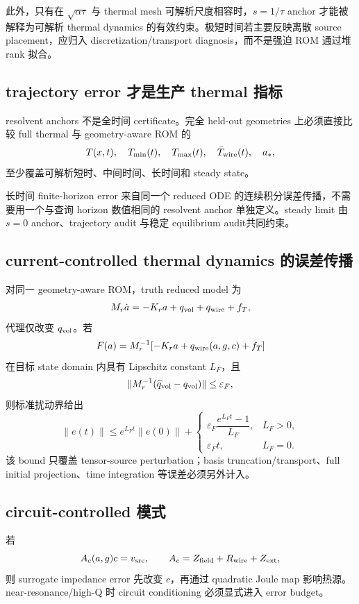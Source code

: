 此外，只有在 $\sqrt{\alpha\tau}$ 与 thermal mesh 可解析尺度相容时，$s=1/\tau$ anchor 才能被解释为可解析 thermal dynamics 的有效约束。极短时间若主要反映离散 source placement，应归入 discretization/transport diagnosis，而不是强迫 ROM 通过堆 rank 拟合。

\subsection{trajectory error 才是生产 thermal 指标}
resolvent anchors 不是全时间 certificate。完全 held-out geometries 上必须直接比较 full thermal 与 geometry-aware ROM 的
\begin{equation}
T(x,t),\quad T_{\min}(t),\quad T_{\max}(t),\quad \bar T_{\rm wire}(t),\quad a_*,
\end{equation}
至少覆盖可解析短时、中间时间、长时间和 steady state。

长时间 finite-horizon error 来自同一个 reduced ODE 的连续积分误差传播，不需要用一个与查询 horizon 数值相同的 resolvent anchor 单独定义。steady limit 由 $s=0$ anchor、trajectory audit 与稳定 equilibrium audit共同约束。

\subsection{current-controlled thermal dynamics 的误差传播}
对同一 geometry-aware ROM，truth reduced model 为
\begin{equation}
M_r\dot a=-K_ra+q_{\rm vol}+q_{\rm wire}+f_T,
\end{equation}
代理仅改变 $q_{\rm vol}$。若
\begin{equation}
F(a)=M_r^{-1}[-K_ra+q_{\rm wire}(a,g,c)+f_T]
\end{equation}
在目标 state domain 内具有 Lipschitz constant $L_F$，且
\begin{equation}
\|M_r^{-1}(\widehat q_{\rm vol}-q_{\rm vol})\|\le\varepsilon_F,
\end{equation}
则标准扰动界给出
\begin{equation}
\|e(t)\|
\le e^{L_Ft}\|e(0)\|
+\begin{cases}
\varepsilon_F\dfrac{e^{L_Ft}-1}{L_F},&L_F>0,\\
\varepsilon_F t,&L_F=0.
\end{cases}
\end{equation}
该 bound 只覆盖 tensor-source perturbation；basis truncation/transport、full initial projection、time integration 等误差必须另外计入。

\subsection{circuit-controlled 模式}
若
\begin{equation}
A_c(a,g)c=v_{\rm src},
\qquad
A_c=Z_{\rm field}+R_{\rm wire}+Z_{\rm ext},
\end{equation}
则 surrogate impedance error 先改变 $c$，再通过 quadratic Joule map 影响热源。near-resonance/high-Q 时 circuit conditioning 必须显式进入 error budget。

